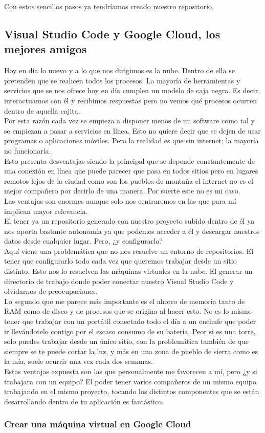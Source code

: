 Con estos sencillos pasos ya tendríamos creado nuestro repositorio.

\subsection{Visual Studio Code y Google Cloud, los mejores amigos}
Hoy en día lo nuevo y a lo que nos dirigimos es la nube. Dentro de ella se pretenden que se realicen todos los procesos. La mayoría de herramientas y servicios que se nos ofrece hoy en día cumplen un modelo de caja negra. Es decir, interactuamos con él y recibimos respuestas pero no vemos qué procesos ocurren dentro de aquella cajita.
\\Por esta razón cada vez se empieza a disponer menos de un software como tal y se empiezan a pasar a servicios en línea. Esto no quiere decir que se dejen de usar programas o aplicaciones móviles. Pero la realidad es que sin internet; la mayoría no funcionaría.
\\Esto presenta desventajas siendo la principal que se depende constantemente de una conexión en línea que puede parecer que pasa en todos sitios pero en lugares remotos lejos de la ciudad como son los pueblos de montaña el internet no es el mejor compañero por decirlo de una manera. Por suerte este no es mi caso.
\\Las ventajas son enormes aunque solo nos centraremos en las que para mí implican mayor relevancia.
\\El tener ya un repositorio generado con nuestro proyecto subido dentro de él ya nos aporta bastante autonomía ya que podemos acceder a él y descargar nuestros datos desde cualquier lugar. Pero, ¿y configurarlo?
\\Aquí viene una problemática que no nos resuelve un entorno de repositorios. El tener que configurarlo todo cada vez que queremos trabajar desde un sitio distinto. Esto nos lo resuelven las máquinas virtuales en la nube. El generar un directorio de trabajo donde poder conectar nuestro Visual Studio Code y olvidarnos de preocupaciones.
\\Lo segundo que me parece más importante es el ahorro de memoria tanto de RAM como de disco y de procesos que se origina al hacer esto. No es lo mismo tener que trabajar con un portátil conectado todo el día a un enchufe que poder ir llevándotelo contigo por el escaso consumo de su batería. Peor si es una torre, solo puedes trabajar desde un único sitio, con la problemática también de que siempre se te puede cortar la luz, y más en una zona de pueblo de sierra como es la mía, suele ocurrir una vez cada dos semanas.
\\Estas ventajas expuesta son las que personalmente me favorecen a mí, pero ¿y si trabajara con un equipo? El poder tener varios compañeros de un mismo equipo trabajando en el mismo proyecto, tocando los distintos componentes que se están desarrollando dentro de tu aplicación es fantástico.

\subsubsection{Crear una máquina virtual en Google Cloud}

